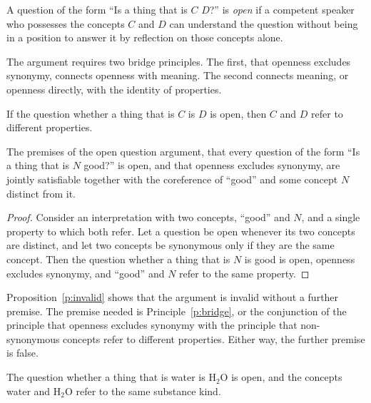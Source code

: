 \documentclass{situationist-preprint}
\begin{document}
\begin{definition}[Openness]\label{d:open}
A question of the form \enquote{Is a thing that is $C$ $D$?} is \emph{open} if a competent speaker who possesses the concepts $C$ and $D$ can understand the question without being in a position to answer it by reflection on those concepts alone.
\end{definition}

The argument requires two bridge principles. The first, that openness excludes synonymy, connects openness with meaning. The second connects meaning, or openness directly, with the identity of properties.

\begin{principle}\label{p:bridge}
If the question whether a thing that is $C$ is $D$ is open, then $C$ and $D$ refer to different properties.
\end{principle}

\begin{proposition}[Invalidity]\label{p:invalid}
The premises of the open question argument, that every question of the form \enquote{Is a thing that is $N$ good?} is open, and that openness excludes synonymy, are jointly satisfiable together with the coreference of \enquote{good} and some concept $N$ distinct from it.
\end{proposition}

\begin{proof}
Consider an interpretation with two concepts, \enquote{good} and $N$, and a single property to which both refer. Let a question be open whenever its two concepts are distinct, and let two concepts be synonymous only if they are the same concept. Then the question whether a thing that is $N$ is good is open, openness excludes synonymy, and \enquote{good} and $N$ refer to the same property.
\end{proof}

Proposition~\ref{p:invalid} shows that the argument is invalid without a further premise. The premise needed is Principle~\ref{p:bridge}, or the conjunction of the principle that openness excludes synonymy with the principle that non-synonymous concepts refer to different properties. Either way, the further premise is false.

\begin{assumption}\label{a:water}
The question whether a thing that is water is H$_2$O is open, and the concepts water and H$_2$O refer to the same substance kind.
\end{assumption}
\end{document}
